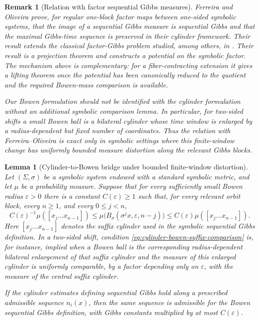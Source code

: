 \documentclass[11pt,a4paper]{article}
\newtheorem{lemma}[theorem]{Lemma}
\newtheorem{remark}[theorem]{Remark}
\newcommand{\eps}{\varepsilon}
\begin{document}
\begin{remark}[Relation with factor sequential Gibbs measures]
\label{rem:factor-sequential-gibbs}
Ferreira and Oliveira \cite{FerreiraOliveira} prove, for regular one-block
factor maps between one-sided symbolic systems, that the image of a sequential
Gibbs measure is sequential Gibbs and that the maximal Gibbs-time sequence is
preserved in their cylinder framework. Their result extends the classical
factor-Gibbs problem studied, among others, in
\cite{KemptonPollicott,ChazottesUgalde,KemptonSFT,Piraino}. Their result is a projection theorem
and constructs a potential on the symbolic factor. The mechanism above is
complementary: for a fiber-contracting extension it gives a lifting theorem
once the potential has been canonically reduced to the quotient and the
required Bowen-mass comparison is available.

Our Bowen formulation should not be identified with the cylinder formulation
without an additional symbolic comparison lemma. In particular, for two-sided
shifts a small Bowen ball is a bilateral cylinder whose time window is enlarged
by a radius-dependent but fixed number of coordinates. Thus the relation with
Ferreira--Oliveira is exact only in symbolic settings where this finite-window
change has uniformly bounded measure distortion along the relevant Gibbs
blocks.
\end{remark}

\begin{lemma}[Cylinder-to-Bowen bridge under bounded finite-window distortion]
\label{lem:cylinder-bowen-bridge}
Let $(\Sigma,\sigma)$ be a symbolic system endowed with a standard symbolic
metric, and let $\mu$ be a probability measure. Suppose that for every
sufficiently small Bowen radius $\eps>0$ there is a constant
$C(\eps)\ge1$ such that, for every relevant orbit block, every $n\ge1$, and
every $0\le j<n$,
\begin{equation}
 C(\eps)^{-1}
 \mu([x_j\ldots x_{n-1}])
 \le
 \mu\bigl(B_\sigma(\sigma^jx,\eps,n-j)\bigr)
 \le
 C(\eps)
 \mu([x_j\ldots x_{n-1}]).
 \label{eq:cylinder-bowen-suffix-comparison}
\end{equation}
Here $[x_j\ldots x_{n-1}]$ denotes the suffix cylinder used in the symbolic
sequential Gibbs definition. In a two-sided shift, condition
\eqref{eq:cylinder-bowen-suffix-comparison} is, for instance, implied when a
Bowen ball is the corresponding radius-dependent bilateral enlargement of
that suffix cylinder and the measure of this enlarged cylinder is uniformly
comparable, by a factor depending only on $\eps$, with the measure of the
central suffix cylinder.

If the cylinder estimates defining sequential Gibbs hold along a prescribed
admissible sequence $n_i(x)$, then the same sequence is admissible for the
Bowen sequential Gibbs definition, with Gibbs constants multiplied by at most
$C(\eps)$.
\end{lemma}
\end{document}
